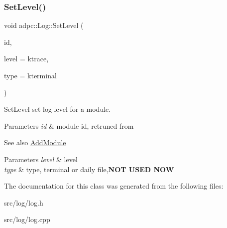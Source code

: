 \subsubsection{\texorpdfstring{Set\+Level()}{SetLevel()}}
{\footnotesize\ttfamily void adpc\+::\+Log\+::\+Set\+Level (\begin{DoxyParamCaption}\item[{const size\+\_\+t \&}]{id,  }\item[{const \hyperlink{log__config_8h_a172986fa5f658c5fe0b42bd954e9e133}{Log\+Level}}]{level = {\ttfamily ktrace},  }\item[{const Log\+Sink\+Type}]{type = {\ttfamily kterminal} }\end{DoxyParamCaption})\hspace{0.3cm}{\ttfamily [inline]}}



Set\+Level set log level for a module. 


\begin{DoxyParams}{Parameters}
{\em id} & module id, retruned from \\
\hline
\end{DoxyParams}
\begin{DoxySeeAlso}{See also}
\hyperlink{classadpc_1_1Log_a6b5cdb7e0f4a7cd5f29d031af4800ea7}{Add\+Module} 
\end{DoxySeeAlso}

\begin{DoxyParams}{Parameters}
{\em level} & level \\
\hline
{\em type} & type, terminal or daily file,{\bfseries N\+OT U\+S\+ED N\+OW} \\
\hline
\end{DoxyParams}


The documentation for this class was generated from the following files\+:\begin{DoxyCompactItemize}
\item 
src/log/log.\+h\item 
src/log/log.\+cpp\end{DoxyCompactItemize}
